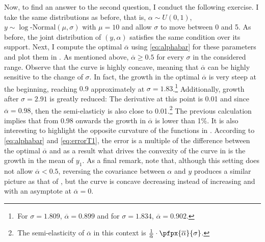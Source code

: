 \documentclass[english, a4paper, 12pt]{article}
\begin{document}
Now, to find an answer to the second question, I conduct the following exercise. I take the same distributions as before, that is, $\alpha \sim U(0,1)$, $y \sim \log\text{-Normal}(\mu, \sigma)$ with $\mu = 10$ and allow $\sigma$ to move between 0 and 5. As before, the joint distribution of $(y,\alpha)$ satisfies the same condition over its support. Next, I compute the optimal $\overline{\alpha}$ using \eqref{eq:alphabar} for these parameters and plot them in . As mentioned above, $\overline{\alpha} \geq 0.5$ for every $\sigma$ in the considered range. Observe that the curve is highly concave, meaning that $\overline{\alpha}$ can be highly sensitive to the change of $\sigma$. In fact, the growth in the optimal $\overline{\alpha}$ is very steep at the beginning, reaching $0.9$ approximately at $\sigma = 1.83$.\footnote{\,For $\sigma = 1.809$, $\overline{\alpha} = 0.899$ and for $\sigma = 1.834$, $\overline{\alpha} = 0.902$.} Additionally, growth after $\sigma = 2.91$ is greatly reduced: The derivative at this point is 0.01 and since $\overline{\alpha} = 0.98$, then the semi-elasticiy is also close to 0.01.\footnote{\,The semi-elasticity of $\overline{\alpha}$ in this context is $\frac{1}{\overline{\alpha}} \cdot \pfpx{\overline{\alpha}}{\sigma}$.} The previous calculation implies that from 0.98 onwards the growth in $\overline{\alpha}$ is lower than 1\%.  It is also interesting to highlight the opposite curvature of the functions in . According to \eqref{eq:alphabar} and \eqref{eq:errorT1}, the error is a multiple of the difference between the optimal $\overline{\alpha}$ and as a result what drives the convexity of the curve in  is the growth in the mean of $y_{1}$. As a final remark, note that, although this setting does not allow $\overline{\alpha} < 0.5$, reversing the covariance between $\alpha$ and $y$ produces a similar picture as that of , but the curve is concave decreasing instead of increasing and with an asymptote at $\overline{\alpha} = 0$.
\vfill
\end{document}
